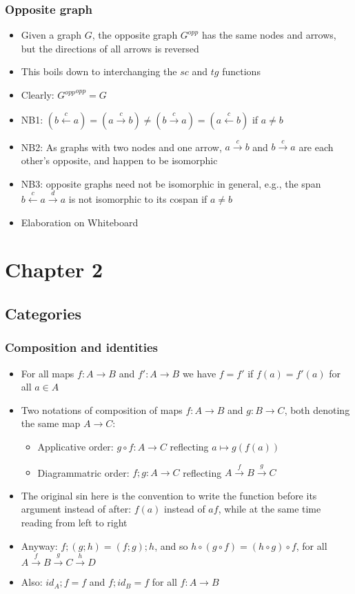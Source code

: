 \documentclass[handout]{beamer}
\begin{document}
\frame
  {   
    \frametitle{Opposite graph}\label{Ch1:oppgraph}

 \begin{itemize}[<+->]
\item Given a graph $G$, the opposite graph $G^{opp}$ has the same nodes
and arrows, but the directions of all arrows is reversed
\item This boils down to interchanging the $sc$ and $tg$ functions
\item Clearly: ${G^{opp}}^{opp} = G$
\item NB1: $(b \stackrel{c}{\leftarrow} a) = (a \stackrel{c}{\to} b) \neq  
(b \stackrel{c}{\to} a) = (a \stackrel{c}{\leftarrow} b) $
if $a\neq b$
\item NB2: As graphs with two nodes and one arrow, ${a \stackrel{c}{\to} b}$
and ${b \stackrel{c}{\to} a}$ are each other's opposite, and happen to be isomorphic
\item NB3: opposite graphs need not be isomorphic in general, e.g., the span
${b \stackrel{c}{\leftarrow} a}\stackrel{d}{\to}a$ is not isomorphic to its cospan if $a\neq b$
\item Elaboration on Whiteboard
 \end{itemize}

 }

\section{Chapter 2}
\subsection{Categories}


\frame
  {   
    \frametitle{Composition and identities}\label{Ch2:comp-id}

 \begin{itemize}[<+->]
\item For all maps $f:A\to B$ and $f':A\to B$ we have $f=f'$ if $f(a)=f'(a)$ for all $a\in A$
\item Two notations of composition of maps $f:A\to B$ and $g: B\to C$,
both denoting the same map $A\to C$:
   \begin{itemize}[<+->]
\item Applicative order: ${g\circ f} : {A\to C}$ reflecting $a\mapsto g(f(a))$
\item Diagrammatric order: ${f;g} : A\to C$ reflecting $A\stackrel{f}{\to}B\stackrel{g}{\to}C$
   \end{itemize}
\item The original sin here is the convention to write the function before its argument
instead of after: $f(a)$ instead of $af$,
while at the same time reading from left to right
\item Anyway: $f;(g;h) = (f;g);h$, and so $h\circ(g\circ f) = (h\circ g)\circ f$,
for all $A\stackrel{f}{\to}B\stackrel{g}{\to}C\stackrel{h}{\to}D$
\item Also: $id_A ; f = f$ and $f; id_B = f$ for all $f:A\to B$
 \end{itemize}

 }
\end{document}
